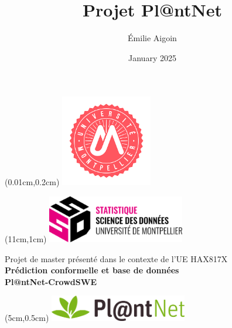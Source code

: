\documentclass[a4paper,12pt]{article}
\title{Projet Pl@ntNet}
\author{Émilie Aigoin}
\date{January 2025}
\begin{document}
\begin{textblock*}{3cm}(0.01cm,0.2cm)
    \includegraphics[width=4cm]{images/Universite.png}
\end{textblock*}

\begin{textblock*}{3cm}(11cm,1cm)
    \includegraphics[width=6cm]{images/SSD.png} 
\end{textblock*}

\vspace{8cm}
\begin{center}
\large{Projet de master présenté dans le contexte de l'UE HAX817X} \\ \vspace{0.4cm}
    {\LARGE \textbf{Prédiction conformelle et base de données \\ \vspace{0.4cm} Pl@ntNet-CrowdSWE}}\\[1cm]
\end{center}

\begin{textblock*}{3cm}(5cm,0.5cm)
    \includegraphics[width=6cm]{images/plantenet.png}
\end{textblock*}
\end{document}
